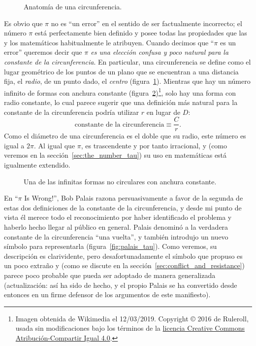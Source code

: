 \begin{figure}
\caption{Anatomía de una circunferencia.\label{fig:circle}}
\end{figure}

Es obvio que $\pi$ no es ``un error'' en el sentido de ser factualmente incorrecto; el número $\pi$ está perfectamente bien definido y posee todas las propiedades que las y los matemáticos habitualmente le atribuyen. Cuando decimos que ``$\pi$ es un error'' queremos decir que \emph{$\pi$ es una elección confusa y poco natural para la constante de la circunferencia}. En particular, una circunferencia se define como el lugar geométrico de los puntos de un plano que se encuentran a una distancia fija, el \emph{radio}, de un punto dado, el \emph{centro} (figura~\ref{fig:circle}). Mientras que hay un número infinito de formas con anchura constante (figura~\ref{fig:constant_width})\footnote{Imagen obtenida de Wikimedia el 12/03/2019. Copyright © 2016 de Ruleroll, usada sin modificaciones bajo los términos de la \href{https://creativecommons.org/licenses/by-sa/4.0/deed.es}{licencia Creative Commons Atribución-Compartir Igual 4.0}.}, solo hay una forma con radio constante, lo cual parece sugerir que una definición más natural para la constante de la circunferencia podría utilizar $r$ en lugar de $D$:
\begin{equation}
\label{eq:circle_constant}
\mbox{constante de la circunferencia} \equiv \frac{C}{r}.
\end{equation}
Como el diámetro de una circunferencia es el doble que su radio, este número es igual a $2\pi$. Al igual que $\pi$, es trascendente y por tanto irracional, y (como veremos en la sección~\ref{sec:the_number_tau}) su uso en matemáticas está igualmente extendido.

\begin{figure}
\caption{Una de las infinitas formas no circulares con anchura constante.\label{fig:constant_width}}
\end{figure}

En ``$\pi$ Is Wrong!'', Bob Palais razona persuasivamente a favor de la segunda de estas dos definiciones de la constante de la circunferencia, y desde mi punto de vista él merece todo el reconocimiento por haber identificado el problema y haberlo hecho llegar al público en general. Palais denominó a la verdadera constante de la circunferencia ``una vuelta'', y también introdujo un nuevo símbolo para representarla (figura~\ref{fig:palais_tau}). Como veremos, su descripción es clarividente, pero desafortunadamente el símbolo que propuso es un poco extraño y (como se discute en la sección~\ref{sec:conflict_and_resistance}) parece poco probable que pueda ser adoptado de manera generalizada (actualización: así ha sido de hecho, y el propio Palais se ha convertido desde entonces en un firme defensor de los argumentos de este manifiesto).

